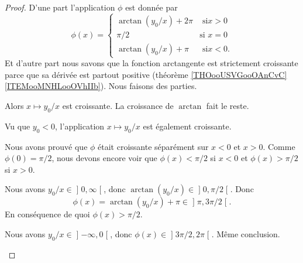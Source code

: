 \begin{proof}
	D'une part l'application \( \phi\) est donnée par
	\begin{equation}
		\phi(x)=\begin{cases}
			\arctan(y_0/x)+2\pi & \text{ si} x>0   \\
			\pi/2               & \text{si }x=0    \\
			\arctan(y_0/x)+\pi  & \text{ si} x<0 .
		\end{cases}
	\end{equation}
	Et d'autre part nous savons que la fonction arctangente est strictement croissante parce que sa dérivée est partout positive (théorème \ref{THOooUSVGooOAnCvC}\ref{ITEMooMNHLooOVhIIb}). Nous faisons des parties.
	\begin{subproof}
		\spitem[Pour \( x<0\)]
		Alors \( x\mapsto y_0/x\) est croissante. La croissance de \( \arctan\) fait le reste.

		\spitem[Pour \( x>0\)]
		Vu que \( y_0<0\), l'application \( x\mapsto y_0/x\) est également croissante.

		\spitem[La suite]
		Nous avons prouvé que \( \phi\) était croissante séparément sur \( x<0\) et \( x>0\). Comme \( \phi(0)=\pi/2\), nous devons encore voir que \( \phi(x)<\pi/2\) si \( x<0\) et \( \phi(x)>\pi/2\) si \( x>0\).

		Nous avons \( y_0/x\in \mathopen] 0,\infty\mathclose[\), donc \( \arctan(y_0/x)\in \mathopen] 0,\pi/2\mathclose[\). Donc
			\begin{equation}
				\phi(x)=\arctan(y_0/x)+\pi\in \mathopen] \pi,3\pi/2\mathclose[.
			\end{equation}
			En conséquence de quoi \( \phi(x)>\pi/2\).

			Nous avons \( y_0/x\in\mathopen] -\infty,0\mathclose[\), donc \( \phi(x)\in\mathopen] 3\pi/2,2\pi\mathclose[\). Même conclusion.
	\end{subproof}
\end{proof}


